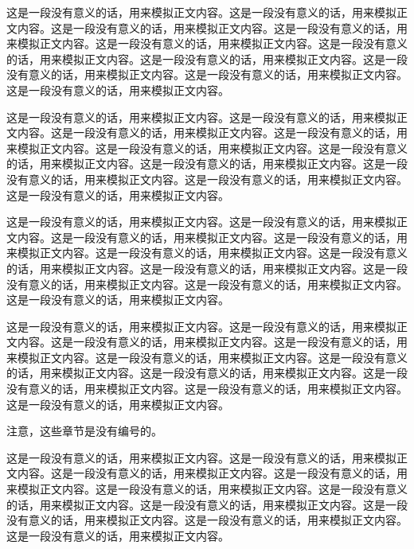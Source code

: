这是一段没有意义的话，用来模拟正文内容。这是一段没有意义的话，用来模拟正文内容。这是一段没有意义的话，用来模拟正文内容。这是一段没有意义的话，用来模拟正文内容。这是一段没有意义的话，用来模拟正文内容。这是一段没有意义的话，用来模拟正文内容。这是一段没有意义的话，用来模拟正文内容。这是一段没有意义的话，用来模拟正文内容。这是一段没有意义的话，用来模拟正文内容。这是一段没有意义的话，用来模拟正文内容。


这是一段没有意义的话，用来模拟正文内容。这是一段没有意义的话，用来模拟正文内容。这是一段没有意义的话，用来模拟正文内容。这是一段没有意义的话，用来模拟正文内容。这是一段没有意义的话，用来模拟正文内容。这是一段没有意义的话，用来模拟正文内容。这是一段没有意义的话，用来模拟正文内容。这是一段没有意义的话，用来模拟正文内容。这是一段没有意义的话，用来模拟正文内容。这是一段没有意义的话，用来模拟正文内容。


这是一段没有意义的话，用来模拟正文内容。这是一段没有意义的话，用来模拟正文内容。这是一段没有意义的话，用来模拟正文内容。这是一段没有意义的话，用来模拟正文内容。这是一段没有意义的话，用来模拟正文内容。这是一段没有意义的话，用来模拟正文内容。这是一段没有意义的话，用来模拟正文内容。这是一段没有意义的话，用来模拟正文内容。这是一段没有意义的话，用来模拟正文内容。这是一段没有意义的话，用来模拟正文内容。



这是一段没有意义的话，用来模拟正文内容。这是一段没有意义的话，用来模拟正文内容。这是一段没有意义的话，用来模拟正文内容。这是一段没有意义的话，用来模拟正文内容。这是一段没有意义的话，用来模拟正文内容。这是一段没有意义的话，用来模拟正文内容。这是一段没有意义的话，用来模拟正文内容。这是一段没有意义的话，用来模拟正文内容。这是一段没有意义的话，用来模拟正文内容。这是一段没有意义的话，用来模拟正文内容。




注意，这些章节是没有编号的。

这是一段没有意义的话，用来模拟正文内容。这是一段没有意义的话，用来模拟正文内容。这是一段没有意义的话，用来模拟正文内容。这是一段没有意义的话，用来模拟正文内容。这是一段没有意义的话，用来模拟正文内容。这是一段没有意义的话，用来模拟正文内容。这是一段没有意义的话，用来模拟正文内容。这是一段没有意义的话，用来模拟正文内容。这是一段没有意义的话，用来模拟正文内容。这是一段没有意义的话，用来模拟正文内容。

